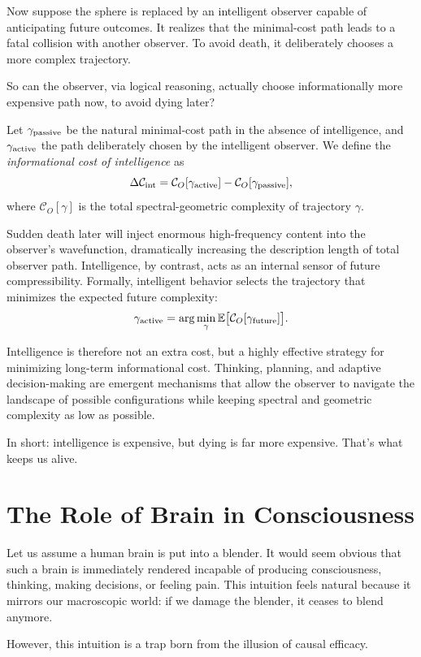 Now suppose the sphere is replaced by an intelligent observer capable of anticipating future outcomes.
It realizes that the minimal-cost path leads to a fatal collision with another observer.
To avoid death, it deliberately chooses a more complex trajectory.

So can the observer, via logical reasoning, actually choose informationally more expensive path now, to avoid dying later? 

Let $\gamma_{\rm passive}$ be the natural minimal-cost path in the absence of intelligence, and $\gamma_{\rm active}$ the path deliberately chosen by the intelligent observer.
We define the \emph{informational cost of intelligence} as
\[
\Delta \mathcal{C}_{\rm int} = \mathcal{C}_O[\gamma_{\rm active}] - \mathcal{C}_O[\gamma_{\rm passive}],
\]
where $\mathcal{C}_O[\gamma]$ is the total spectral-geometric complexity of trajectory $\gamma$.

Sudden death later will inject enormous high-frequency content into the observer's wavefunction, dramatically increasing the description length of total observer path.
Intelligence, by contrast, acts as an internal sensor of future compressibility.
Formally, intelligent behavior selects the trajectory that minimizes the expected future complexity:
\[
\gamma_{\rm active} = \arg\min_\gamma \mathbb{E}\bigl[\mathcal{C}_O[\gamma_{\rm future}]\bigr].
\]

Intelligence is therefore not an extra cost, but a highly effective strategy for minimizing long-term informational cost.
Thinking, planning, and adaptive decision-making are emergent mechanisms that allow the observer to navigate the landscape of possible configurations while keeping spectral and geometric complexity as low as possible.

In short: intelligence is expensive, but dying is far more expensive. That's what keeps us alive. 


\section{The Role of Brain in Consciousness}

Let us assume a human brain is put into a blender.
It would seem obvious that such a brain is immediately rendered incapable of producing consciousness, thinking, making decisions, or feeling pain.
This intuition feels natural because it mirrors our macroscopic world: if we damage the blender, it ceases to blend anymore.

However, this intuition is a trap born from the illusion of causal efficacy. 

